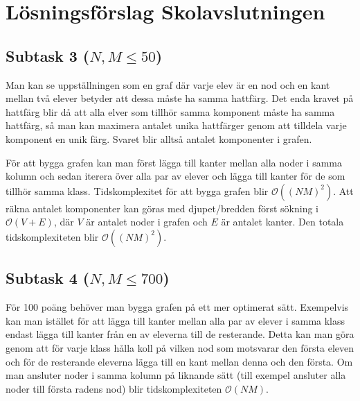 \documentclass{article}
\begin{document}
    \section*{Lösningsförslag Skolavslutningen}
    
    \subsection*{Subtask 3 ($N, M \leq 50$)}
    Man kan se uppställningen som en graf där varje elev är en nod och en kant mellan två elever betyder att dessa måste ha samma hattfärg. Det enda kravet på hattfärg blir då att alla elver som tillhör samma komponent måste ha samma hattfärg, så man kan maximera antalet unika hattfärger genom att tilldela varje komponent en unik färg. Svaret blir alltså antalet komponenter i grafen.
    
    För att bygga grafen kan man först lägga till kanter mellan alla noder i samma kolumn och sedan iterera över alla par av elever och lägga till kanter för de som tillhör samma klass. Tidskomplexitet för att bygga grafen blir $\mathcal{O}((NM)^2)$. Att räkna antalet komponenter kan göras med djupet/bredden först sökning i $\mathcal{O}(V + E)$, där $V$ är antalet noder i grafen och $E$ är antalet kanter. Den totala tidskomplexiteten blir $\mathcal{O}((NM)^2)$.
    
    \subsection*{Subtask 4 ($N, M \leq 700$)}
    För 100 poäng behöver man bygga grafen på ett mer optimerat sätt. Exempelvis kan man istället för att lägga till kanter mellan alla par av elever i samma klass endast lägga till kanter från en av eleverna till de resterande. Detta kan man göra genom att för varje klass hålla koll på vilken nod som motsvarar den första eleven och för de resterande eleverna lägga till en kant mellan denna och den första. Om man ansluter noder i samma kolumn på liknande sätt (till exempel ansluter alla noder till första radens nod) blir tidskomplexiteten $\mathcal{O}(NM)$.
\end{document}
